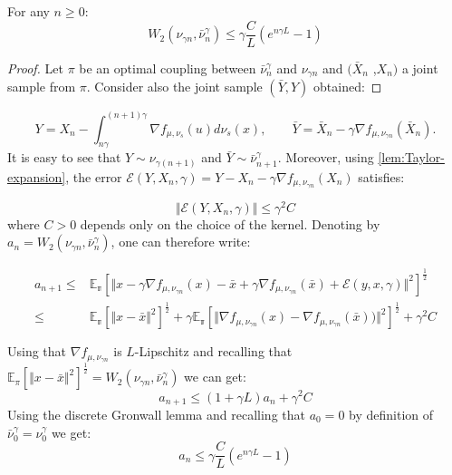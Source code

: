 \begin{lemma}
\label{lem:euler_error_1}For any $n\geq0$:
\[
W_{2}(\nu_{\gamma n},\bar{\nu}_{n}^{\gamma})\le\gamma\frac{C}{L}(e^{n\gamma L}-1)
\]
\end{lemma}
\begin{proof}
Let $\pi$ be an optimal coupling between $\bar{\nu}_{n}^{\gamma}$
and $\nu_{\gamma n}$ and $(\bar{X}_{n}$ ,$X_{n})$ a joint sample
from $\pi$. Consider also the joint sample $(\bar{Y},Y)$ obtained:
\end{proof}
\[
Y=X_{n}-\int_{n\gamma}^{(n+1)\gamma}\nabla f_{\mu,\nu_{s}}(u)d\nu_{s}(x),\qquad\bar{Y}=\bar{X}_{n}-\gamma\nabla f_{\mu,\nu_{\gamma n}}(\bar{X}_{n}).
\]
It is easy to see that $Y\sim\nu_{\gamma(n+1)}$ and $\bar{Y}\sim\bar{\nu}_{n+1}^{\gamma}$.
Moreover, using \ref{lem:Taylor-expansion}, the error $\mathcal{E}(Y,X_{n},\gamma)=Y-X_{n}-\gamma\nabla f_{\mu,\nu_{\gamma n}}(X_{n})$
satisfies:

\[
\Vert\mathcal{E}(Y,X_{n},\gamma)\Vert\leq\gamma^{2}C
\]
where $C>0$ depends only on the choice of the kernel. Denoting by
$a_{n}=W_{2}(\nu_{\gamma n},\bar{\nu}_{n}^{\gamma})$, one can therefore
write:

\begin{align*}
a_{n+1}\leq & \mathbb{E_{\pi}}\left[\Vert x-\gamma\nabla f_{\mu,\nu_{\gamma n}}(x)-\bar{x}+\gamma\nabla f_{\mu,\nu_{\gamma n}}(\bar{x})+\mathcal{E}(y,x,\gamma)\Vert^{2}\right]^{\frac{1}{2}}\\
\leq & \mathbb{E_{\pi}}\left[\Vert x-\bar{x}\Vert^{2}\right]^{\frac{1}{2}}+\gamma\mathbb{E_{\pi}}\left[\Vert\nabla f_{\mu,\nu_{\gamma n}}(x)-\nabla f_{\mu,\nu_{\gamma n}}(\bar{x}))\Vert^{2}\right]^{\frac{1}{2}}+\gamma^{2}C\\
\\
\end{align*}
Using that $\nabla f_{\mu,\nu_{\gamma n}}$ is $L$-Lipschitz and
recalling that $\mathbb{E}_{\pi}\left[\Vert x-\bar{x}\Vert^{2}\right]^{\frac{1}{2}}=W_{2}(\nu_{\gamma n},\bar{\nu}_{n}^{\gamma})$
we can get:
\[
a_{n+1}\leq(1+\gamma L)a_{n}+\gamma^{2}C
\]
Using the discrete Gronwall lemma and recalling that $a_{0}=0$ by
definition of $\bar{\nu}_{0}^{\gamma}=\nu_{0}^{\gamma}$ we get:
\[
a_{n}\leq\gamma\frac{C}{L}(e^{n\gamma L}-1)
\]

